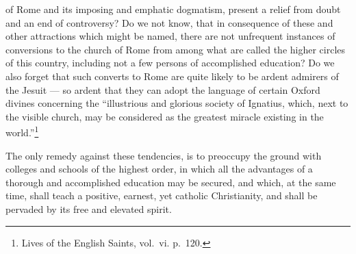\documentclass[]{book}
\let\rmarkdownfootnote\footnote%
\def\footnote{\protect\rmarkdownfootnote}
\begin{document}
of Rome and its imposing and emphatic dogmatism, present a relief from doubt and an end of controversy? Do we not know, that in consequence of these and other attractions which might be named, there are not unfrequent instances of conversions to the church of Rome from among what are called the higher circles of this country, including not a few persons of accomplished education? Do we also forget that such converts to Rome are quite likely to be ardent admirers of the Jesuit --- so ardent that they can adopt the language of certain Oxford divines concerning the ``illustrious and glorious society of Ignatius, which, next to the visible church, may be considered as the greatest miracle existing in the world.''\footnote{Lives of the English Saints, vol.~vi. p.~120.}

The only remedy against these tendencies, is to preoccupy the ground with colleges and schools of the highest order, in which all the advantages of a thorough and accomplished education may be secured, and which, at the same time, shall teach a positive, earnest, yet catholic Christianity, and shall be pervaded by its free and elevated spirit.
\end{document}
